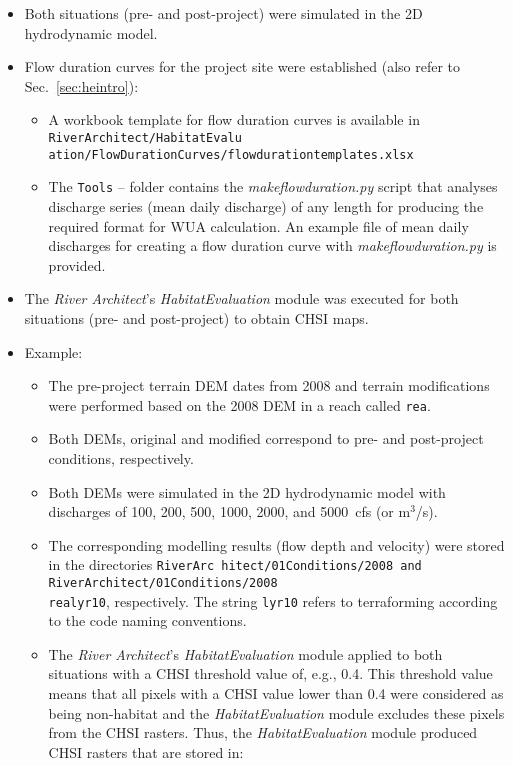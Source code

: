 \begin{itemize}
\item
  Both situations (pre- and post-project) were simulated in the 2D hydrodynamic model.
\item
  Flow duration curves for the project site were established (also refer to Sec.~\ref{sec:heintro}):
  \begin{itemize}
  \item
    A workbook template for flow duration curves is available in \texttt{RiverArchitect/HabitatEvalu ation/FlowDurationCurves/flow{\myUnderscore}duration{\myUnderscore}templates.xlsx}
  \item
    The \texttt{Tools} -- folder contains the \emph{make{\myUnderscore}flow{\myUnderscore}duration.py} script that analyses discharge series (mean daily discharge) of any length for producing the required format for WUA calculation. An example file of mean daily discharges for creating a flow duration curve with \emph{make{\myUnderscore}flow{\myUnderscore}duration.py} is provided.
  \end{itemize}
\item
  The \emph{River Architect}'s \emph{HabitatEvaluation} module was executed for both situations (pre- and post-project) to obtain CHSI maps.
\item Example:
  \begin{itemize}
  \item The pre-project terrain DEM dates from 2008 and terrain modifications were performed based on the 2008 DEM in a reach called \texttt{rea}.
  \item Both DEMs, original and modified correspond to pre- and post-project conditions, respectively.
  \item Both DEMs were simulated in the 2D hydrodynamic model with discharges of 100, 200, 500, 1000, 2000, and 5000~cfs (or m$^3$/s).
  \item The corresponding modelling results (flow depth and velocity) were stored in the directories \texttt{RiverArc hitect/01{\myUnderscore}Conditions/2008 and RiverArchitect/01{\myUnderscore}Conditions/2008{\myUnderscore}}\\
  \texttt{rea{\myUnderscore}lyr10}, respectively. The string \texttt{lyr10} refers to terraforming according to the code naming conventions.
  \item The \emph{River Architect}'s \emph{HabitatEvaluation} module applied to both situations with a CHSI threshold value of, e.g., 0.4. This threshold value means that all pixels with a CHSI value lower than 0.4 were considered as being non-habitat and the \emph{HabitatEvaluation} module excludes these pixels from the CHSI rasters. Thus, the \emph{HabitatEvaluation} module produced CHSI rasters that are stored in:

\end{itemize}
\end{itemize}
